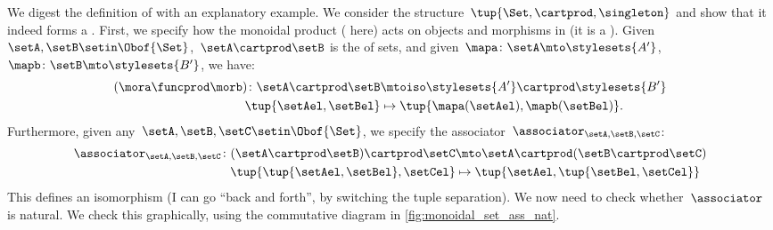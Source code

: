 
\begin{example}
    We digest the definition of  with an explanatory example.
    We consider the structure~$\tup{\Set,{{\cartprod}},\singleton}$ and show that it indeed forms a .
    First, we specify how the monoidal product ( here) acts on objects and morphisms in \Set (it is a ).
    Given~$\setA,\setB\setin \Obof{\Set}$,~$\setA\cartprod \setB$ is the  of sets, and given~$\mapa\colon \setA\mto \stylesets{A'}$,~$\mapb\colon \setB\mto \stylesets{B'}$, we have:
    \begin{equation}
        \label{eq:set_mon_prod_2}
        \begin{aligned}
            (\mora \funcprod \morb)
            \colon \setA\cartprod \setB & \mtoiso \stylesets{A'}\cartprod \stylesets{B'} \\
            \tup{\setAel,\setBel}       & \mapsto \tup{\mapa(\setAel),\mapb(\setBel)}.
        \end{aligned}
    \end{equation}
    Furthermore, given any~$\setA,\setB,\setC\setin \Obof{\Set}$, we specify the associator~$\associator_{\setA,\setB,\setC}$:
    \begin{equation}
        \label{eq:set_mon_prod_3}
        \begin{aligned}
            \associator_{\setA,\setB,\setC}\colon (\setA\cartprod \setB)\cartprod \setC & \mto \setA\cartprod (\setB\cartprod \setC) \\
            \tup{\tup{\setAel,\setBel},\setCel}                                         & \mapsto \tup{\setAel, \tup{\setBel,\setCel}}
        \end{aligned}
    \end{equation}
    This defines an isomorphism (I can go ``back and forth'', by switching the tuple separation).
    We now need to check whether~$\associator$ is natural.
    We check this graphically, using the commutative diagram in \cref{fig:monoidal_set_ass_nat}.


\end{example}
